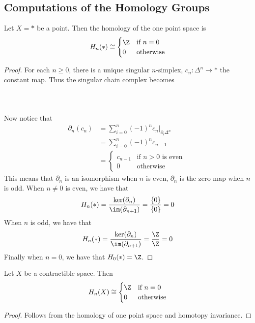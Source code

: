 \documentclass[a4paper]{article}
\begin{document}
\subsection{Computations of the Homology Groups}
\begin{prp}{}{} Let $X=\ast$ be a point. Then the homology of the one point space is $$H_n(\ast)\cong\begin{cases}
\Z & \text{if } n=0\\
0 & \text{otherwise}
\end{cases}$$ \tcbline
\begin{proof}
For each $n\geq 0$, there is a unique singular $n$-simplex, $c_n:\Delta^n\to\ast$ the constant map. Thus the singular chain complex becomes \\~\\
\\~\\
Now notice that 
\begin{align*}
\partial_n(c_n)&=\sum_{i=0}^n(-1)^nc_n|_{\partial_i\Delta^n}\\
&=\sum_{i=0}^n(-1)^nc_{n-1}\\
&=\begin{cases}
c_{n-1} & \text{if } n>0\text{ is even }\\
0 & \text{otherwise }
\end{cases}
\end{align*}
This means that $\partial_n$ is an isomorphism when $n$ is even, $\partial_n$ is the zero map when $n$ is odd. When $n\neq 0$ is even, we have that $$H_n(\ast)=\frac{\ker(\partial_n)}{\im(\partial_{n+1})}=\frac{\{0\}}{\{0\}}=0$$ When $n$ is odd, we have that $$H_n(\ast)=\frac{\ker(\partial_n)}{\im(\partial_{n+1})}=\frac{\Z}{\Z}=0$$ Finally when $n=0$, we have that $H_0(\ast)=\Z$. 
\end{proof}
\end{prp}

\begin{crl}{}{} Let $X$ be a contractible space. Then $$H_n(X)\cong\begin{cases}
\Z & \text{if } n=0\\
0 & \text{otherwise}
\end{cases}$$ \tcbline
\begin{proof}
Follows from the homology of one point space and homotopy invariance. 
\end{proof}
\end{crl}
\end{document}
